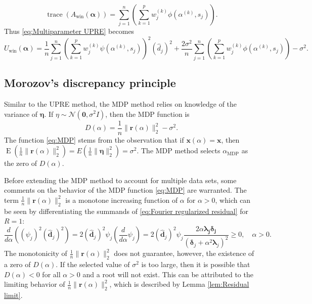 \documentclass[12pt]{article}
\newcommand{\dVec}{\mathbf{d}}	%
\newcommand{\rVec}{\mathbf{r}}	%
\newcommand{\xVec}{\mathbf{x}}	%
\DeclareMathOperator{\trace}{trace}		%
\newcommand{\dft}[1]{\widehat{#1}}	%
\newcommand{\regparam}{\alpha}  %
\newcommand{\regparamVec}{\mathbf{\regparam}}   %
\newcommand{\xReg}{\xVec(\regparam)}	%
\newcommand{\filt}{\phi}
\newcommand{\mfilt}{\psi}
\newcommand{\noise}{\eta}	%
\newcommand{\noiseSD}{\sigma}	%
\newcommand{\noiseVec}{\bm{\noise}}	%
\DeclareMathOperator{\E}{E}	%
\newcommand{\singular}{s}	%
\newcommand{\D}{D}	%
\newcommand{\MDP}{\text{MDP}}	%
\begin{document}
\begin{equation}
    \trace\left(A_\text{win}(\regparamVec)\right) = \sum_{j=1}^{n} \left(\sum_{k=1}^{p} w_j^{(k)} \filt\left(\regparam^{(k)},\singular_j\right) \right).
\end{equation}
Thus \eqref{eq:Multiparameter UPRE} becomes
\begin{equation}
\label{eq:Multiparameter UPRE 2}
    U_\text{win}(\regparamVec) = \frac{1}{n}\sum_{j=1}^{n} \left(\sum_{k=1}^{p} w_j^{(k)} \mfilt\left(\regparam^{(k)},\singular_j\right) \right)^2 \left(\dft{d}_j\right)^2 + \frac{2\noiseSD^2}{n}\sum_{j=1}^{n} \left(\sum_{k=1}^{p} w_j^{(k)} \filt\left(\regparam^{(k)},\singular_j\right) \right) - \noiseSD^2.
\end{equation}

\subsection{Morozov's discrepancy principle} \label{sec:MDP}
Similar to the UPRE method, the MDP method relies on knowledge of the variance of $\noiseVec$. If $\noise \sim \mathcal{N}(\bm{0},\noiseSD^2I)$, then the MDP function is 
\begin{equation}
\label{eq:MDP}
\D(\regparam) = \frac{1}{n}\|\rVec(\regparam)\|_2^2 - \noiseSD^2.
\end{equation}
The function \eqref{eq:MDP} stems from the observation that if $\xReg = \xVec$, then $\E(\frac{1}{n}\|\rVec(\regparam)\|_2^2) = E(\frac{1}{n}\|\noiseVec\|_2^2) = \noiseSD^2$. The MDP method selects $\regparam_{\MDP}$ as the zero of $\D(\regparam)$.  \par 
Before extending the MDP method to account for multiple data sets, some comments on the behavior of the MDP function \eqref{eq:MDP} are warranted. The term $\frac{1}{n}\|\rVec(\regparam)\|_2^2$ is a monotone increasing function of $\regparam$ for $\regparam > 0$, which can be seen by differentiating the summands of \eqref{eq:Fourier regularized residual} for $R = 1$:
\[\frac{d}{d\regparam}\left(\left(\mfilt_j\right)^2\left(\dft{\dVec}_j\right)^2\right) = 2 \left(\dft{\dVec}_j\right)^2 \mfilt_j\left(\frac{d}{d\regparam}\mfilt_j\right) = 2 \left(\dft{\dVec}_j\right)^2 \mfilt_j \frac{2\regparam\bm{\lambda_j}\bm{\delta_j}}{\left(\bm{\delta}_j + \regparam^2 \bm{\lambda}_j\right)^2} \geq 0, \quad \regparam > 0.\]
The monotonicity of $\frac{1}{n}\|\rVec(\regparam)\|_2^2$ does not guarantee, however, the existence of a zero of $\D(\regparam)$. If the selected value of $\noiseSD^2$ is too large, then it is possible that $\D(\regparam) < 0$ for all $\regparam > 0$ and a root will not exist. This can be attributed to the limiting behavior of $\frac{1}{n}\|\rVec(\regparam)\|_2^2$, which is described by Lemma \ref{lem:Residual limit}.
\end{document}
